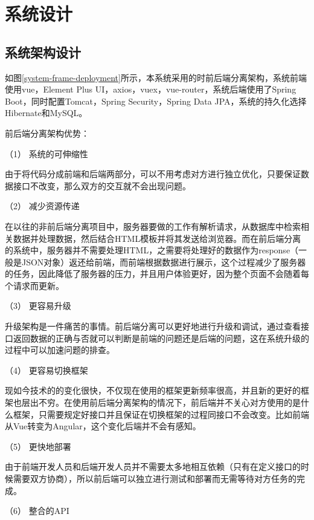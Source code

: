 
\chapter{系统设计}

\label{系统设计}


\section{系统架构设计}

如图\ref{system-frame-deployment}所示，本系统采用的时前后端分离架构，系统前端使用vue，Element Plus UI，axios，vuex，vue-router，系统后端使用了Spring Boot，同时配置Tomcat，Spring Security，Spring Data JPA，系统的持久化选择Hibernate和MySQL。

前后端分离架构优势：

（1） 系统的可伸缩性

由于将代码分成前端和后端两部分，可以不用考虑对方进行独立优化，只要保证数据接口不改变，那么双方的交互就不会出现问题。

（2） 减少资源传递

在以往的非前后端分离项目中，服务器要做的工作有解析请求，从数据库中检索相关数据并处理数据，然后结合HTML模板并将其发送给浏览器。而在前后端分离的系统中，服务器并不需要处理HTML，之需要将处理好的数据作为response（一般是JSON对象）返还给前端，而前端根据数据进行展示，这个过程减少了服务器的任务，因此降低了服务器的压力，并且用户体验更好，因为整个页面不会随着每个请求而更新。

（3） 更容易升级

升级架构是一件痛苦的事情。前后端分离可以更好地进行升级和调试，通过查看接口返回数据的正确与否就可以判断是前端的问题还是后端的问题，这在系统升级的过程中可以加速问题的排查。

（4） 更容易切换框架

现如今技术的的变化很快，不仅现在使用的框架更新频率很高，并且新的更好的框架也层出不穷。在使用前后端分离架构的情况下，前后端并不关心对方使用的是什么框架，只需要规定好接口并且保证在切换框架的过程同接口不会改变。比如前端从Vue转变为Angular，这个变化后端并不会有感知。

（5） 更快地部署

由于前端开发人员和后端开发人员并不需要太多地相互依赖（只有在定义接口的时候需要双方协商），所以前后端可以独立进行测试和部署而无需等待对方任务的完成。

（6） 整合的API

